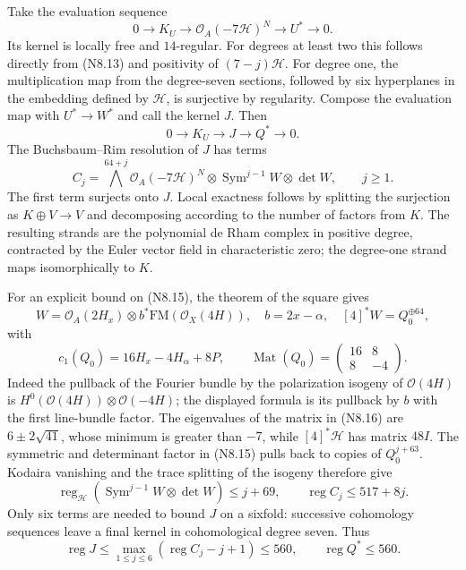 Take the evaluation sequence
\[
 0\to K_U\to\mathcal O_A(-7\mathcal H)^N\to U^*\to0.
\]
Its kernel is locally free and $14$-regular. For degrees at least
two this follows directly from (N8.13) and positivity of
$(7-j)\mathcal H$. For degree one, the multiplication map from
the degree-seven sections, followed by six hyperplanes in the
embedding defined by $\mathcal H$, is surjective by regularity.
Compose the evaluation map with $U^*\to W^*$ and call the kernel
$J$. Then
\[
 0\to K_U\to J\to Q^*\to0.                              \tag{N8.14}
\]
The Buchsbaum--Rim resolution of $J$ has terms
\[
 C_j=\bigwedge^{64+j}\mathcal O_A(-7\mathcal H)^N
          \otimes\operatorname{Sym}^{j-1}W\otimes\det W,
 \qquad j\ge1.                                           \tag{N8.15}
\]
The first term surjects onto $J$. Local exactness follows by
splitting the surjection as $K\oplus V\to V$ and decomposing
according to the number of factors from $K$. The resulting
strands are the polynomial de Rham complex in positive degree,
contracted by the Euler vector field in characteristic zero;
the degree-one strand maps isomorphically to $K$.

For an explicit bound on (N8.15), the theorem of the square gives
\[
 W=\mathcal O_A(2H_x)\otimes b^*\mathrm{FM}(\mathcal O_X(4H)),
 \quad b=2x-\alpha,
 \quad [4]^*W=Q_0^{\oplus64},
\]
with
\[
 c_1(Q_0)=16H_x-4H_\alpha+8P,\qquad
 \operatorname{Mat}(Q_0)=\begin{pmatrix}16&8\\8&-4\end{pmatrix}.
                                                               \tag{N8.16}
\]
Indeed the pullback of the Fourier bundle by the polarization
isogeny of $\mathcal O(4H)$ is
$H^0(\mathcal O(4H))\otimes\mathcal O(-4H)$; the displayed
formula is its pullback by $b$ with the first line-bundle factor.
The eigenvalues of the matrix in (N8.16) are $6\pm2\sqrt{41}$,
whose minimum is greater than $-7$, while
$[4]^*\mathcal H$ has matrix $48I$. The symmetric and determinant
factor in (N8.15) pulls back to copies of $Q_0^{j+63}$.
Kodaira vanishing and the trace splitting of the isogeny therefore
give
\[
 \operatorname{reg}_{\mathcal H}
   (\operatorname{Sym}^{j-1}W\otimes\det W)\le j+69,
 \qquad \operatorname{reg}C_j\le517+8j.                  \tag{N8.17}
\]
Only six terms are needed to bound $J$ on a sixfold: successive
cohomology sequences leave a final kernel in cohomological
degree seven. Thus
\[
 \operatorname{reg}J\le
 \max_{1\le j\le6}(\operatorname{reg}C_j-j+1)
 \le560,\qquad\operatorname{reg}Q^*\le560.               \tag{N8.18}
\]

